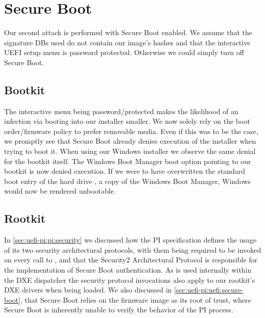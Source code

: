 
\section{Secure Boot}
\label{sec:attacks:secure-boot}

Our second attack is performed with Secure Boot enabled.
We assume that the signature \acp{DB} used do not contain our image's hashes and that the interactive \ac{UEFI} setup menu is password protected.
Otherwise we could simply turn off Secure Boot.

\subsection{Bootkit}

The interactive menu being password\-/protected makes the likelihood of an infection via booting into our installer smaller.
We now solely rely on the boot order/firmware policy to prefer removable media.
Even if this was to be the case, we promptly see that Secure Boot already denies execution of the installer when trying to boot it.
When using our Windows installer we observe the same denial for the bootkit itself.
The Windows Boot Manager boot option pointing to our bootkit is now denied execution.
If we were to have overwritten the standard boot entry of the hard drive , a copy of the Windows Boot Manager, Windows would now be rendered unbootable.

\subsection{Rootkit}

In \autoref{sec:uefi-pi:pi:security} we discussed how the \ac{PI} specification defines the usage of its two security architectural protocols, with them being required to be invoked on every call to , and that the Security2 Architectural Protocol is responsible for the implementation of Secure Boot authentication.
As  is used internally within the \ac{DXE} dispatcher the security protocol invocations also apply to our rootkit's \ac{DXE} drivers when being loaded.
We also discussed in \autoref{sec:uefi-pi:uefi:secure-boot}, that Secure Boot relies on the firmware image as its root of trust, where Secure Boot is inherently unable to verify the behavior of the \ac{PI} process.

